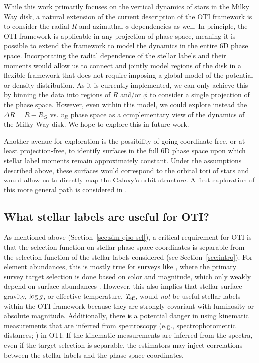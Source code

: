 \documentclass[modern]{aastex631}
\begin{document}
While this work primarily focuses on the vertical dynamics of stars in the Milky Way
disk, a natural extension of the current description of the OTI framework is to consider
the radial $R$ and azimuthal $\phi$ dependencies as well.
In principle, the OTI framework is applicable in any projection of phase space, meaning
it is possible to extend the framework to model the dynamics in the entire 6D phase
space.
Incorporating the radial dependence of the stellar labels and their moments would allow
us to connect and jointly model regions of the disk in a flexible framework that does
not require imposing a global model of the potential or density distribution.
As it is currently implemented, we can only achieve this by binning the data into
regions of $R$ and/or $\phi$ to consider a single projection of the phase space.
However, even within this model, we could explore instead the $\Delta R = R - R_G$ vs.
$v_R$ phase space as a complementary view of the dynamics of the Milky Way disk. We hope
to explore this in future work.

Another avenue for exploration is the possibility of going coordinate-free, or at least
projection-free, to identify surfaces in the full 6D phase space upon which stellar
label moments remain approximately constant.
Under the assumptions described above, these surfaces would correspond to the orbital
tori of stars and would allow us to directly map the Galaxy's orbit structure.
A first exploration of this more general path is considered in \cite{Novara:inprep}.


\subsection{What stellar labels are useful for OTI?} \label{sec:disc-what-labels}

As mentioned above (Section~\ref{sec:sim-qiso-sel}), a critical requirement for OTI is
that the selection function on stellar phase-space coordinates is separable from the
selection function of the stellar labels considered (see Section~\ref{sec:intro}).
For element abundances, this is mostly true for surveys like \apogee, where the primary
survey target selection is done based on color and magnitude, which only weakly depend
on surface abundances \citep{Zasowski:2017, Santana:2021, Beaton:2021}.
However, this also implies that stellar surface gravity, $\log g$, or effective
temperature, $T_{\textrm{eff}}$, would \emph{not} be useful stellar labels within the OTI framework
because they are strongly covariant with luminosity or absolute magnitude.
Additionally, there is a potential danger in using kinematic measurements that are
inferred from spectroscopy (e.g., spectrophotometric distances; \citealt{Hogg:2019,
Leung:2019}) in OTI:
If the kinematic measurements are inferred from the spectra, even if the target
selection is separable, the estimators may inject correlations between the stellar
labels and the phase-space coordinates.
\end{document}
